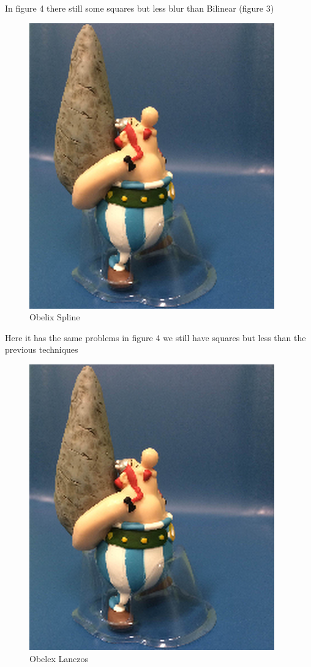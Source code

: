 \documentclass{article}
\begin{document}
In figure 4 there still some squares but less blur than Bilinear (figure 3)
\begin{figure}[H]
\begin{center}
\includegraphics[scale=1]{oblexspline.png}
\end{center}
\caption{Obelix Spline}
\end{figure}
Here it has the same problems in figure 4 we still have squares but less than the previous techniques 
\begin{figure}[H]
\begin{center}
\includegraphics[scale=1]{ObelexLanczos.png}
\end{center}
\caption{Obelex Lanczos}
\end{figure}
\end{document}

